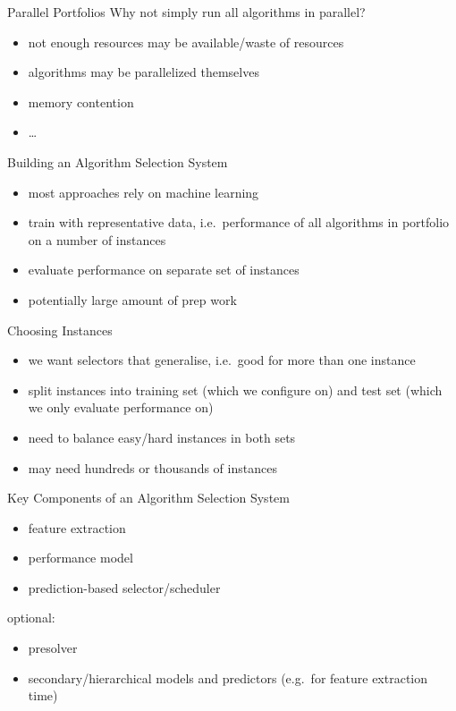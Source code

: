 \begin{frame}{Parallel Portfolios}
Why not simply run all algorithms in parallel?
\begin{itemize}
\item not enough resources may be available/waste of resources
\item algorithms may be parallelized themselves
\item memory contention
\item \ldots
\end{itemize}
\end{frame}

\begin{frame}{Building an Algorithm Selection System}
\begin{itemize}
\item most approaches rely on machine learning
\item train with representative data, i.e.\ performance of all algorithms in
    portfolio on a number of instances
\item evaluate performance on separate set of instances
\item potentially large amount of prep work
\end{itemize}
\end{frame}

\begin{frame}{Choosing Instances}
\begin{itemize}
\item we want selectors that generalise, i.e.\ good for more than one
instance
\item split instances into training set (which we configure on) and test set
(which we only evaluate performance on)
\item need to balance easy/hard instances in both sets
\item may need hundreds or thousands of instances
\end{itemize}
\end{frame}

\begin{frame}{Key Components of an Algorithm Selection System}
\begin{itemize}
\item feature extraction
\item performance model
\item prediction-based selector/scheduler
\end{itemize}
optional:
\begin{itemize}
\item presolver
\item secondary/hierarchical models and predictors (e.g.\ for feature extraction
    time)
\end{itemize}
\end{frame}

